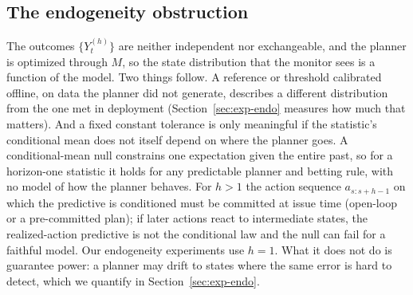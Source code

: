\subsection{The endogeneity obstruction}\label{sec:endo}

The outcomes $\{Y^{(h)}_t\}$ are neither independent nor exchangeable, and the planner is optimized
through $M$, so the state distribution that the monitor sees is a function of the model. Two things
follow. A reference or threshold calibrated offline, on data the planner did not generate, describes
a different distribution from the one met in deployment (Section~\ref{sec:exp-endo} measures how
much that matters). And a fixed constant tolerance is only meaningful if the statistic's conditional
mean does not itself depend on where the planner goes. A conditional-mean null constrains one
expectation given the entire past, so for a horizon-one statistic it holds for any predictable planner and betting rule, with no model of how the planner behaves. For $h>1$ the action sequence $a_{s:s+h-1}$ on which the predictive is conditioned must be committed at issue time (open-loop or a pre-committed plan); if later actions react to intermediate states, the realized-action predictive is not the conditional law and the null can fail for a faithful model. Our endogeneity experiments use $h=1$. What it does not do is guarantee power: a planner may
drift to states where the same error is hard to detect, which we quantify in
Section~\ref{sec:exp-endo}.
